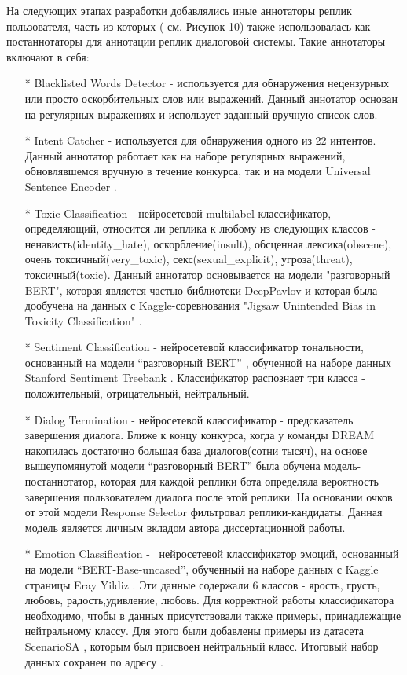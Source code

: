 На следующих этапах разработки добавлялись иные аннотаторы реплик пользователя, часть из которых ( см. Рисунок 10) также использовалась как постаннотаторы для аннотации реплик диалоговой системы. Такие аннотаторы включают в себя:
\begin{itemize}
\item[*] Blacklisted Words Detector - используется для обнаружения нецензурных или просто оскорбительных слов или выражений. Данный аннотатор основан на регулярных выражениях и использует заданный вручную список слов.

\item[*] Intent Catcher - используется для обнаружения одного из 22 интентов. Данный аннотатор работает как на наборе регулярных выражений, обновлявшемся вручную в течение конкурса, так и на модели Universal Sentence Encoder \cite{cer_2018}.

\item[*] Toxic Classification - нейросетевой multilabel классификатор, определяющий, относится ли реплика к любому из следующих классов - ненависть(identity\_hate), оскорбление(insult), обсценная лексика(obscene), очень токсичный(very\_toxic), секс(sexual\_explicit), угроза(threat), токсичный(toxic). Данный аннотатор основывается на модели "разговорный BERT"\cite{dp_conv_bert}, которая является частью библиотеки DeepPavlov и которая была дообучена на данных с Kaggle-соревнования "Jigsaw Unintended Bias in Toxicity Classification" \cite{na_website_ndm_toxic}.

\item[*] Sentiment Classification - нейросетевой классификатор тональности, основанный на модели “разговорный BERT” \cite{na_website_ndn}, обученной на наборе данных Stanford Sentiment Treebank \cite{socher_2013}. Классификатор распознает три класса - положительный, отрицательный, нейтральный.

\item[*] Dialog Termination - нейросетевой классификатор - предсказатель завершения диалога. Ближе к концу конкурса, когда у команды DREAM накопилась достаточно большая база диалогов(сотни тысяч), на основе вышеупомянутой модели “разговорный BERT” была обучена модель-постаннотатор, которая для каждой реплики бота определяла вероятность завершения пользователем диалога после этой реплики. На основании очков от этой модели Response Selector фильтровал реплики-кандидаты. Данная модель является личным вкладом автора диссертационной работы.

\item[*] Emotion Classification -  нейросетевой классификатор эмоций, основанный на модели “BERT-Base-uncased”, обученный на наборе данных с Kaggle страницы Eray Yildiz \cite{na_website_ndp_emo}. Эти данные содержали 6 классов - ярость, грусть, любовь, радость,удивление, любовь. Для корректной работы классификатора необходимо, чтобы в данных присутствовали также примеры, принадлежащие нейтральному классу. Для этого были добавлены примеры из датасета ScenarioSA \cite{scenariosa}, которым был присвоен нейтральный класс. Итоговый набор данных сохранен по адресу \cite{na_website_ndo_emo}.
\end{itemize}
